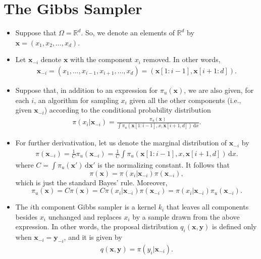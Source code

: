 \documentclass[10pt]{article}
\newcommand{\dee}{\mathrm{d}}
\newcommand{\ve}[1]{\mathbf{#1}}
\newcommand{\Real}{\mathbb{R}}
\begin{document}
\section{The Gibbs Sampler}

\begin{itemize}
  \item Suppose that $\Omega = \Real^d$. So, we denote an elements of $\Real^d$ by $\ve{x} = (x_1, x_2, \dotsc, x_d)$.
  
  \item Let $\ve{x}_{-i}$ denote $\ve{x}$ with the component $x_i$ removed. In other words,
  \begin{align*}
    \ve{x}_{-i} = (x_1, \dotsc, x_{i-1}, x_{i+1}, \dotsc, x_d) = (\ve{x}[1:i-1], \ve{x}[i+1:d]).
  \end{align*}

  \item Suppose that, in addition to an expression for $\pi_u(\ve{x})$, we are also given, for each $i$, an algorithm for sampling $x_i$ given all the other components (i.e., given $\ve{x}_{-i}$) according to the conditional probability distribution
  \begin{align*}
    \pi(x_i | \ve{x}_{-i}) = \frac{\pi_u(\ve{x})}{\int \pi_u(\ve{x}[1:i-1], x, \ve{x}[i+1,d])\, \dee x}.
  \end{align*}
  
  \item For further derivativation, let us denote the marginal distribution of $\ve{x}_{-i}$ by
  \begin{align*}
    \pi(\ve{x}_{-i}) = \frac{1}{C} \pi_u(\ve{x}_{-i}) = \frac{1}{C} \int \pi_u(\ve{x}[1:i-1], x, \ve{x}[i+1,d])\, \dee x.
  \end{align*}
  where $C = \int \pi_u(\ve{x}')\, \dee \ve{x}'$ is the normalizing constant. It follows that $$\pi(\ve{x}) = \pi(x_i|\ve{x}_{-i}) \pi(\ve{x}_{-i}),$$ which is just the standard Bayes' rule. Moreover, $$\pi_u(\ve{x}) = C\pi(\ve{x}) = C \pi(x_i|\ve{x}_{-i}) \pi(\ve{x}_{-i}) = \pi(x_i|\ve{x}_{-i}) \pi_u(\ve{x}_{-i}).$$
  
  \item The $i$th component Gibbs sampler is a kernel $k_i$ that leaves all components besides $x_i$ unchanged and replaces $x_i$ by a sample drawn from the above expression. In other words, the proposal distribution $q_i(\ve{x},\ve{y})$ is defined only when $\ve{x}_{-i} = \ve{y}_{-i}$, and it is given by
  \begin{align*}
    q(\ve{x},\ve{y}) = \pi(y_i | \ve{x}_{-i}).
  \end{align*}


\end{itemize}
\end{document}
